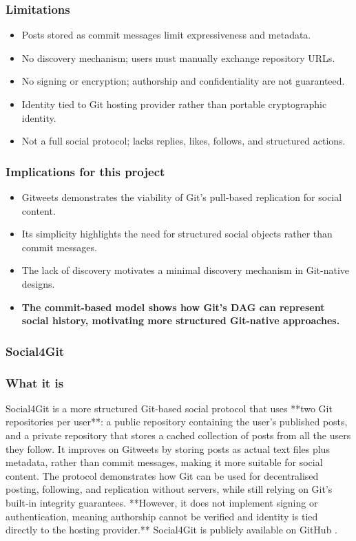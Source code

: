 \subsubsection*{Limitations}
\begin{itemize}
    \item Posts stored as commit messages limit expressiveness and metadata.
    \item No discovery mechanism; users must manually exchange repository URLs.
    \item No signing or encryption; authorship and confidentiality are not guaranteed.
    \item Identity tied to Git hosting provider rather than portable cryptographic identity.
    \item Not a full social protocol; lacks replies, likes, follows, and structured actions.
\end{itemize}

\subsubsection*{Implications for this project}
\begin{itemize}
    \item Gitweets demonstrates the viability of Git’s pull-based replication for social content.
    \item Its simplicity highlights the need for structured social objects rather than commit messages.
    \item The lack of discovery motivates a minimal discovery mechanism in Git-native designs.
    \item \textbf{The commit-based model shows how Git’s DAG can represent social history, motivating more structured Git-native approaches.}
\end{itemize}
\subsubsection{Social4Git}

\subsubsection*{What it is}
Social4Git is a more structured Git‑based social protocol that uses **two Git repositories per user**:
a public repository containing the user’s published posts, and a private repository that stores a
cached collection of posts from all the users they follow. It improves on Gitweets by storing posts as
actual text files plus metadata, rather than commit messages, making it more suitable for social
content. The protocol demonstrates how Git can be used for decentralised posting, following, and
replication without servers, while still relying on Git’s built‑in integrity guarantees. **However, it does
not implement signing or authentication, meaning authorship cannot be verified and identity is tied
directly to the hosting provider.**  Social4Git is publicly available on GitHub \cite{social4git2026}.

